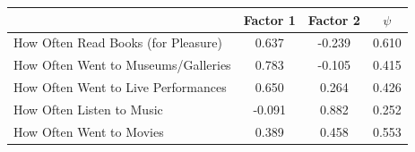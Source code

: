 {
\def\sym#1{\ifmmode^{#1}\else\(^{#1}\)\fi}
\begin{tabular*}{\hsize}{@{\hskip\tabcolsep\extracolsep\fill}l*{1}{ccc}}
\toprule
                    &    Factor 1&    Factor 2&      $\psi$\\
\midrule
How Often Read Books (for Pleasure)&       0.637&      -0.239&       0.610\\
How Often Went to Museums/Galleries&       0.783&      -0.105&       0.415\\
How Often Went to Live Performances&       0.650&       0.264&       0.426\\
How Often Listen to Music&      -0.091&       0.882&       0.252\\
How Often Went to Movies&       0.389&       0.458&       0.553\\
\bottomrule
\end{tabular*}
}
